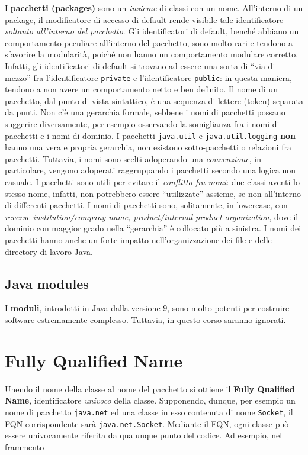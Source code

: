 \documentclass[\fontsizeclass,twocolumn]{\classname}
\theoremstyle{definition}
\theoremstyle{definition}
\begin{document}
I \textbf{pacchetti (packages)} sono un \emph{insieme} di classi con un nome.
All'interno di un package, il modificatore di accesso di default rende visibile
tale identificatore \emph{soltanto all'interno del pacchetto}. Gli
identificatori di default, benché abbiano un comportamento peculiare
all'interno del pacchetto, sono molto rari e tendono a sfavorire la modularità,
poiché non hanno un comportamento modulare corretto. Infatti, gli
identificatori di default si trovano ad essere una sorta di ``via di mezzo''
fra l'identificatore \texttt{private} e l'identificatore \texttt{public}: in
questa maniera, tendono a non avere un comportamento netto e ben definito.
Il nome di un pacchetto, dal punto di vista sintattico, è una sequenza di
lettere (token) separata da punti. Non c'è una gerarchia formale, sebbene i
nomi di pacchetti possano suggerire diversamente, per esempio osservando la
somiglianza fra i nomi di pacchetti e i nomi di dominio. I pacchetti
\texttt{java.util} e \texttt{java.util.logging} \textbf{non} hanno una vera e
propria gerarchia, non esistono sotto-pacchetti o relazioni fra pacchetti.
Tuttavia, i nomi sono scelti adoperando una \emph{convenzione}, in particolare,
vengono adoperati raggruppando i pacchetti secondo una logica non casuale.
I pacchetti sono utili per evitare il \emph{conflitto fra nomi}: due classi
aventi lo stesso nome, infatti, non potrebbero essere ``utilizzate'' assieme,
se non all'interno di differenti pacchetti. I nomi di pacchetti sono,
solitamente, in lowercase, con \emph{reverse institution/company name,
product/internal product organization}, dove il dominio con maggior grado nella
``gerarchia'' è collocato più a sinistra. I nomi dei pacchetti hanno anche un
forte impatto nell'organizzazione dei file e delle directory di lavoro Java.

\subsection{Java modules}

I \textbf{moduli}, introdotti in Java dalla versione $9$, sono molto potenti
per costruire software estremamente complesso. Tuttavia, in questo corso
saranno ignorati.

\section{Fully Qualified Name}

Unendo il nome della classe al nome del pacchetto si ottiene il \textbf{Fully
Qualified Name}, identificatore \emph{univoco} della classe. Supponendo,
dunque, per esempio un nome di pacchetto \texttt{java.net} ed una classe in
esso contenuta di nome \texttt{Socket}, il FQN corrispondente sarà
\texttt{java.net.Socket}. Mediante il FQN, ogni classe può essere univocamente
riferita da qualunque punto del codice. Ad esempio, nel frammento
\end{document}
